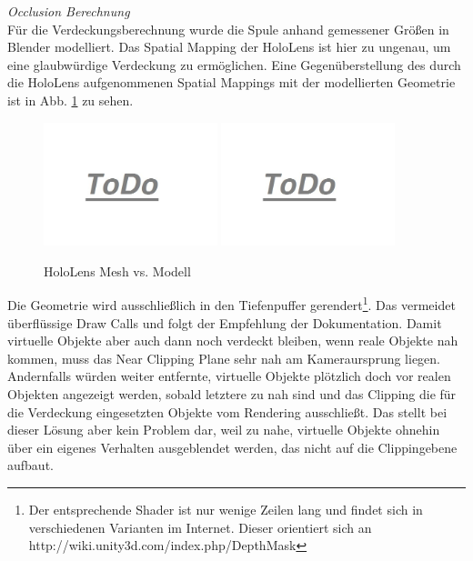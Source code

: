 \textit{Occlusion Berechnung}\\
Für die Verdeckungsberechnung wurde die Spule anhand gemessener Größen in Blender modelliert. Das Spatial Mapping der HoloLens ist hier zu ungenau, um eine glaubwürdige Verdeckung zu ermöglichen. Eine Gegenüberstellung des durch die HoloLens aufgenommenen Spatial Mappings mit der modellierten Geometrie ist in Abb. \ref{img:mesh-vs-model} zu sehen.
\begin{figure}[H]
	\centering
	\includegraphics[width=0.45\textwidth]{images/todo.jpg}
	\hspace{0.05cm}	
	\includegraphics[width=0.45\textwidth]{images/todo.jpg}
	\caption{HoloLens Mesh vs. Modell}
	\label{img:mesh-vs-model}
\end{figure}
Die Geometrie wird ausschließlich in den Tiefenpuffer gerendert\footnote{Der entsprechende Shader ist nur wenige Zeilen lang und findet sich in verschiedenen Varianten im Internet. Dieser orientiert sich an http://wiki.unity3d.com/index.php/DepthMask}. Das vermeidet überflüssige Draw Calls und folgt der Empfehlung der Dokumentation. Damit virtuelle Objekte aber auch dann noch verdeckt bleiben, wenn reale Objekte nah kommen, muss das Near Clipping Plane sehr nah am Kameraursprung liegen. Andernfalls würden weiter entfernte, virtuelle Objekte plötzlich doch vor realen Objekten angezeigt werden, sobald letztere zu nah sind und das Clipping die für die Verdeckung eingesetzten Objekte vom Rendering ausschließt. Das stellt bei dieser Lösung aber kein Problem dar, weil zu nahe, virtuelle Objekte ohnehin über ein eigenes Verhalten ausgeblendet werden, das nicht auf die Clippingebene aufbaut.\\


